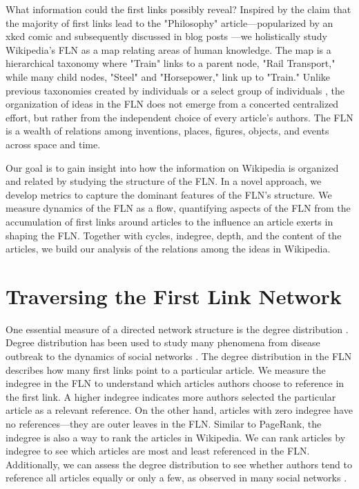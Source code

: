 \documentclass[pre,twocolumn,twoside,superscriptaddress,floatfix, aps, 10pt]{revtex4-1}
\begin{document}
What information could the first links possibly reveal?
Inspired by the claim that the majority of first links lead to the 
"Philosophy" article---popularized by an xkcd comic and subsequently
discussed in blog posts 
\cite{mat_blog}
\cite{Ilmari_first_links}
\cite{xkcd} 
---we holistically study 
Wikipedia's FLN as a map relating areas of human knowledge. 
The map is a hierarchical taxonomy where "Train" links to a parent node, 
"Rail Transport," while many child nodes, "Steel" and "Horsepower," link up to 
"Train." Unlike previous taxonomies
created by individuals
\cite{locke}
\cite{descartes}
\cite{aristotle} 
or a select group of individuals 
\cite{hist_thesaurus}, 
the organization of ideas in the FLN 
does not emerge from a concerted centralized effort, 
but rather from the independent choice of every article's authors.
The FLN is a wealth of relations among inventions, places,
figures, objects, and events across space and time.


Our goal is to gain insight into how the information on Wikipedia is organized and related
by studying the structure of the FLN.
In a novel approach, we develop metrics to capture 
the dominant features of the FLN's structure.
We measure dynamics of the FLN as a flow, quantifying 
aspects of the FLN from the accumulation of first links around articles 
to the influence an article exerts in shaping the FLN.
Together with cycles, indegree, depth, and the content of the articles, 
we build our analysis of the relations among the ideas in Wikipedia.


\section{Traversing the First Link Network}

One essential measure of a directed network structure is the degree distribution 
\cite{newman}. 
Degree distribution has been used to study many phenomena from disease outbreak 
\cite{disease} 
to the dynamics of social networks 
\cite{social_nets}.
The degree distribution in the FLN describes how many first links point to a particular article. 
We measure the indegree in the FLN to understand which articles authors choose to reference in 
the first link.
A higher indegree indicates more authors selected the particular article
as a relevant reference. On the other hand, articles with zero 
indegree have no references---they are outer leaves in the FLN. 
Similar to PageRank, the indegree is also a way to rank the articles in Wikipedia.
We can rank articles by indegree to see which articles are most and least referenced in the FLN. 
Additionally, we can assess the degree distribution to see whether authors tend to reference all articles
equally or only a few, as observed in many social networks \cite{social_nets}.
\end{document}
